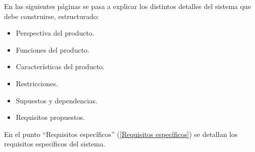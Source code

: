 En las siguientes páginas se pasa a explicar los distintos detalles del sistema que debe construirse, estructurado:

\begin{itemize}
    \item Perspectiva del producto.
    \item Funciones del producto.
    \item Características del producto.
    \item Restricciones.
    \item Supuestos y dependencias.
    \item Requisitos propuestos.
\end{itemize}

En el punto ``Requisitos específicos'' (\ref{Requisitos específicos}) se detallan los requisitos específicos del sistema.